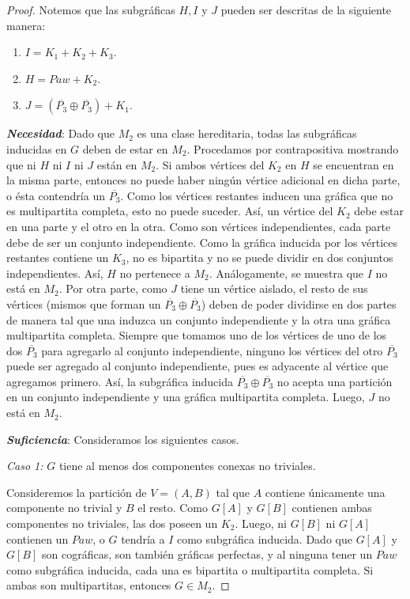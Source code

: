\begin{proof}

    Notemos que las subgráficas $H, I$ y $J$ pueden ser descritas de la siguiente manera:
    
    \begin{enumerate}[(1)] 
        \item $I = K_1 + K_2 + K_3$.
        \item $H = Paw + K_2$.
        \item $J = (\overline{P_3} \oplus \overline{P_3}) + K_1$.
    \end{enumerate}
    
    \textbf{\emph{Necesidad}}: Dado que $M_2$ es una clase hereditaria, todas las subgráficas inducidas en $G$ deben de estar en $M_2$. Procedamos por contrapositiva mostrando que ni $H$ ni $I$ ni $J$ están en $M_2$. Si ambos vértices del $K_2$ en $H$ se encuentran en la misma parte, entonces no puede haber ningún vértice adicional en dicha parte, o ésta contendría un $\overline{P_3}$. Como los vértices restantes inducen una gráfica que no es multipartita completa, esto no puede suceder. Así, un vértice del $K_2$ debe estar en una parte y el otro en la otra. Como son vértices independientes, cada parte debe de ser un conjunto independiente. Como la gráfica inducida por los vértices restantes contiene un $K_3$, no es bipartita y no se puede dividir en dos conjuntos independientes. Así, $H$ no pertenece a $M_2$. Análogamente, se muestra que $I$ no está en $M_2$. Por otra parte, como $J$ tiene un vértice aislado, el resto de sus vértices (mismos que forman un $\overline{P_3} \oplus \overline{P_3}$) deben de poder dividirse en dos partes de manera tal que una induzca un conjunto independiente y la otra una gráfica multipartita completa. Siempre que tomamos uno de los vértices de uno de los dos $\overline{P_3}$ para agregarlo al conjunto independiente, ninguno los vértices del otro $\overline{P_3}$ puede ser agregado al conjunto independiente, pues es adyacente al vértice que agregamos primero. Así, la subgráfica inducida $\overline{P_3} \oplus \overline{P_3}$ no acepta una partición en un conjunto independiente y una gráfica multipartita completa. Luego, $J$ no está en $M_2$.

    \textbf{\emph{Suficiencia}}: Consideramos los siguientes casos.
    
    \emph{Caso 1:} $G$ tiene al menos dos componentes conexas no triviales.
    
    Consideremos la partición de $V = (A,B)$ tal que $A$ contiene únicamente una componente no trivial y $B$ el resto. Como $G[A]$ y $G[B]$ contienen ambas componentes no triviales, las dos poseen un $K_2$. Luego, ni $G[B]$ ni $G[A]$ contienen un $Paw$, o $G$ tendría a $I$ como subgráfica inducida. Dado que $G[A]$ y $G[B]$ son cográficas, son también gráficas perfectas, y al ninguna tener un $Paw$ como subgráfica inducida, cada una es bipartita o multipartita completa. Si ambas son multipartitas, entonces $G \in M_2$. 
    

\end{proof}
